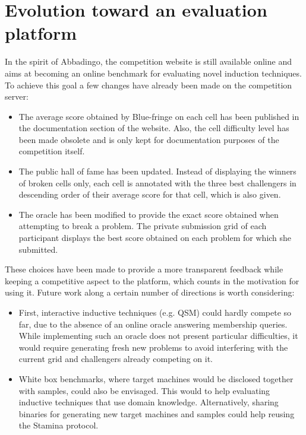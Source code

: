 \section{Evolution toward an evaluation platform\label{section:stamina-platform}}

In the spirit of Abbadingo, the competition website is still available online and aims at becoming an online benchmark for evaluating novel induction techniques. To achieve this goal a few changes have already been made on the competition server:

\begin{itemize}

\item The average score obtained by Blue-fringe on each cell has been published in the documentation section of the website. Also, the cell difficulty level has been made obsolete and is only kept for documentation purposes of the competition itself.

\item The public hall of fame has been updated. Instead of displaying the winners of broken cells only, each cell is annotated with the three best challengers in descending order of their average score for that cell, which is also given. 

\item The oracle has been modified to provide the exact score obtained when attempting to break a problem. The private submission grid of each participant displays the best score obtained on each problem for which she submitted. 

\end{itemize}

These choices have been made to provide a more transparent feedback while keeping a competitive aspect to the platform, which counts in the motivation for using it. Future work along a certain number of directions is worth considering:

\begin{itemize}

\item First, interactive inductive techniques (e.g. QSM) could hardly compete so far, due to the absence of an online oracle answering membership queries. While implementing such an oracle does not present particular difficulties, it would require generating fresh new problems to avoid interfering with the current grid and challengers already competing on it. 

\item White box benchmarks, where target machines would be disclosed together with samples, could also be envisaged. This would to help evaluating inductive techniques that use domain knowledge. Alternatively, sharing binaries for generating new target machines and samples could help reusing the Stamina protocol. 

\end{itemize}

